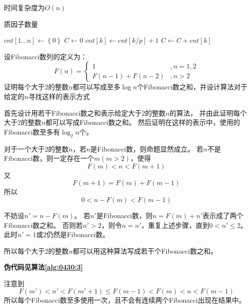 \begin{questions}
\begin{solution}
        时间复杂度为$O(n)$
    \end{solution}

    \begin{algorithm}[!ht]
        \caption{质因子数量}\label{alg:0430:2}
        \begin{algorithmic}[1]
            \State $cnt[1 \dots n] \gets \left\{0\right\}$
            \State $C \gets 0$
            \State $cnt[k] \gets cnt[k/p] + 1$
            \State $C \gets C + cnt[k]$
            \EndIf
            \EndFor
        \end{algorithmic}
    \end{algorithm}

    \question 设Fibonacci数列的定义为：
    \[
        F(n) = \begin{cases}
            1             & , n=1,2 \\
            F(n-1)+F(n-2) & , n > 2
        \end{cases}
    \]
    证明每个大于$2$的整数$n$都可以写成至多$\log{n}$个Fibonacci数之和，并设计算法对于给定的$n$寻找这样的表示方式
    \begin{solution}
        首先设计用若干Fibonacci数之和表示给定大于$2$的整数$n$的算法，
        并由此证明每个大于$2$的整数$n$都可以写成Fibonacci数之和。
        然后证明在这样的表示中，使用的Fibonacci数至多有$\log_2{n}$个。

        对于一个大于$2$的整数$n$，若$n$是Fibonacci数，则命题显然成立。
        若$n$不是Fibonacci数，则一定存在一个$m(m>2)$，使得\[
            F(m) < n < F(m+1)
        \]
        又\[
            F(m+1) = F(m) + F(m-1)
        \]
        所以\[
            0 < n - F(m) < F(m-1)
        \]

        不妨设$n' = n - F(m)$。
        若$n'$是Fibonacci数，则$n = F(m) + n'$表示成了两个Fibonacci数之和。
        否则若$n' > 2$，则令$n=n'$，重复上述步骤，直到$0 < n' \le 2$。
        此时$n'=1$或$2$仍然是Fibonacci数。

        所以每个大于$2$的整数$n$都可以用这种算法写成若干个Fibonacci数之和。

        \textbf{伪代码见算法\ref{alg:0430:3}}

        注意到\[
            F(m') < n' < F(m' + 1) \le F(m-1) < F(m) < n < F(m-1)
        \]
        所以每个Fibonacci数至多使用一次，且不会有连续两个Fibonacci出现在结果中。


\end{solution}
\end{questions}
